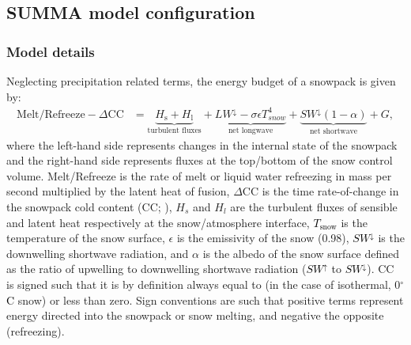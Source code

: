 \documentclass[draft]{agujournal2019}
\newcommand{\lwdn}{\textcolor{black}{$LW^{\downarrow}$}\xspace}
\newcommand{\tsnow}{\textcolor{black}{$T_{\mathrm{snow}}$}\xspace}
\newcommand{\swdn}{\textcolor{black}{$SW^{\downarrow}$}\xspace}
\newcommand{\swup}{\textcolor{black}{$SW^{\uparrow}$}\xspace}
\newcommand{\degrc}{\textcolor{black}{$^\circ$C}\xspace}
\begin{document}

\subsection{SUMMA model configuration}\label{sec:models:summa}
\subsubsection{Model details}
Neglecting precipitation related terms, the energy budget of a snowpack is given by:
\begin{align}\label{eq:energy_budget}
\mathrm{Melt}/ \mathrm{Refreeze}  - \Delta\mathrm{CC}
&= 
\underbrace{
    H_\mathrm{s} + H_\mathrm{l}
}_{\text{turbulent fluxes}}
+
\underbrace{
LW^{\downarrow}- \sigma\epsilon T_{snow}^4
}_{\text{net longwave}}
+
\underbrace{
   SW^{\downarrow}(1-\alpha)
}_{\text{net shortwave}}
+
G,
\end{align}
where the left-hand side represents changes in the internal state of the snowpack and the right-hand side represents fluxes at the top/bottom of the snow control volume. 
Melt/Refreeze is the rate of melt or liquid water refreezing in mass per second multiplied by the latent heat of fusion, $\Delta$CC is the time rate-of-change in the snowpack cold content (CC; ), $H_s$ and $H_l$ are the turbulent fluxes of sensible and latent heat respectively at the snow/atmosphere interface, \tsnow is the temperature of the snow surface, $\epsilon$ is the emissivity of the snow (0.98), \swdn is the downwelling shortwave radiation, and $\alpha$ is the albedo of the snow surface defined as the ratio of upwelling to downwelling shortwave radiation (\swup to \swdn). 
CC is signed such that it is by definition always equal to (in the case of isothermal, 0\degrc snow) or less than zero.
Sign conventions are such that positive terms represent energy directed into the snowpack or snow melting, and negative the opposite (refreezing).
\end{document}
